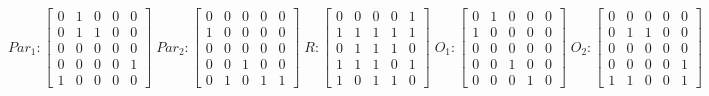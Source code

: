      $$
        Par_{1} : \begin{bmatrix}
            0 & 1 & 0 & 0 & 0 \\
            0 & 1 & 1 & 0 & 0 \\
            0 & 0 & 0 & 0 & 0 \\
			0 & 0 & 0 & 0 & 1 \\
            1 & 0 & 0 & 0 & 0 
        \end{bmatrix}
        \;
        Par_{2} : \begin{bmatrix}
            0 & 0 & 0 & 0 & 0 \\
            1 & 0 & 0 & 0 & 0 \\
            0 & 0 & 0 & 0 & 0 \\
            0 & 0 & 1 & 0 & 0 \\
            0 & 1 & 0 & 1 & 1
        \end{bmatrix}
        \;
        R : \begin{bmatrix}
            0 & 0 & 0 & 0 & 1 \\
            1 & 1 & 1 & 1 & 1 \\
            0 & 1 & 1 & 1 & 0 \\
            1 & 1 & 1 & 0 & 1 \\
            1 & 0 & 1 & 1 & 0
        \end{bmatrix}
        \;
        O_{1} : \begin{bmatrix}
            0 & 1 & 0 & 0 & 0 \\
            1 & 0 & 0 & 0 & 0 \\
            0 & 0 & 0 & 0 & 0 \\
            0 & 0 & 1 & 0 & 0 \\
            0 & 0 & 0 & 1 & 0
        \end{bmatrix}
        \;
        O_{2} : \begin{bmatrix}
            0 & 0 & 0 & 0 & 0 \\
            0 & 1 & 1 & 0 & 0 \\
            0 & 0 & 0 & 0 & 0 \\
            0 & 0 & 0 & 0 & 1 \\
            1 & 1 & 0 & 0 & 1
        \end{bmatrix}
    $$   
